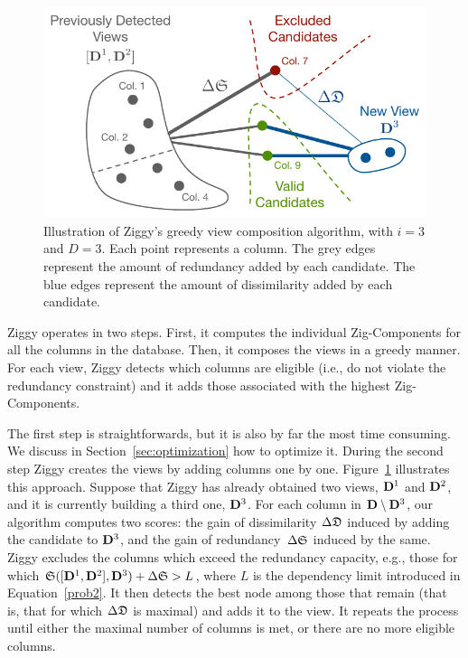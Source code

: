 \begin{figure}
  \centering
  \includegraphics[width=\columnwidth]{Figures/Greedy}
  \caption{Illustration of Ziggy's greedy view composition algorithm, with
      $i=3$
  and $D=3$. Each point represents a column. The grey edges represent the
  amount of redundancy added by each candidate. The blue edges represent the
  amount of dissimilarity added by each candidate.}
  \label{pic:greedy}
\end{figure}
Ziggy operates in two steps. First, it computes the individual Zig-Components
for all the columns in the database. Then, it composes the views in a  greedy
manner. For each view, Ziggy detects which columns are eligible (i.e., do not
violate the redundancy constraint) and it adds those associated with the highest
Zig-Components.

The first step is straightforwards, but it is also by far the most time
consuming. We discuss in Section~\ref{sec:optimization} how to optimize it.
During the second step Ziggy creates the views by adding columns one by one.
Figure~\ref{pic:greedy} illustrates this approach. Suppose that Ziggy has
already obtained two views, $\mathbf{D}^1$ and $\mathbf{D}^2$, and it is currently
building a third one, $\mathbf{D}^3$. For each column in $\mathbf{D} \setminus \mathbf{D}^3
$, our algorithm computes two scores: the gain of dissimilarity $\Delta\mathfrak{D}$
induced by adding the candidate to $\mathbf{D}^3$, and the gain of
redundancy~$\Delta\mathfrak{S}$ induced by the same. Ziggy excludes the columns which
exceed the redundancy capacity, e.g., those for which $\mathfrak{S}([\mathbf{D}^1,
\mathbf{D}^2], \mathbf{D}^3) + \Delta\mathfrak{S} > L$, where $L$ is the dependency limit
introduced in Equation~\ref{prob2}. It then detects the best node among those
that remain (that is, that for which $\Delta\mathfrak{D}$ is maximal) and adds it to
the view. It repeats the process until either the maximal number of columns is
met, or there are no more eligible columns.

